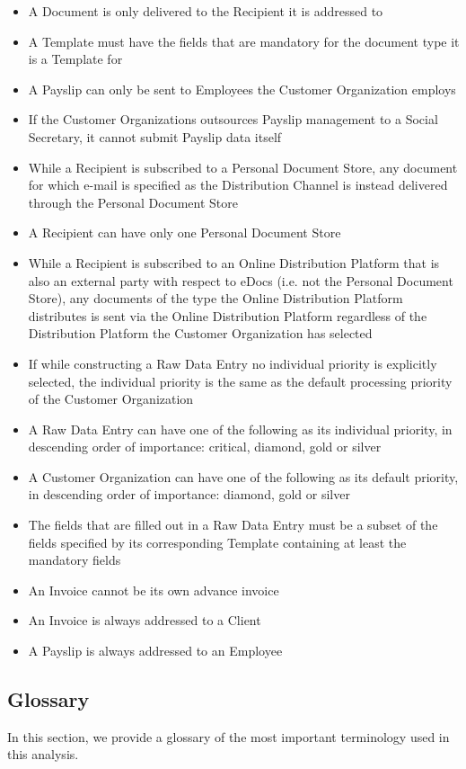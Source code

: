 \documentclass[a4paper,10pt]{article}
\begin{document}
\begin{itemize}
    \item A Document is only delivered to the Recipient it is addressed to
    \item A Template must have the fields that are mandatory for the document type it is a Template for
    \item A Payslip can only be sent to Employees the Customer Organization employs
    \item If the Customer Organizations outsources Payslip management to a Social Secretary, it cannot submit Payslip data itself
    \item While a Recipient is subscribed to a Personal Document Store, any document for which e-mail is specified as the Distribution Channel is instead delivered through the Personal Document Store
    \item A Recipient can have only one Personal Document Store
    \item While a Recipient is subscribed to an Online Distribution Platform that is also an external party with respect to eDocs (i.e. not the Personal Document Store), any documents of the type the Online Distribution Platform distributes is sent via the Online Distribution Platform regardless of the Distribution Platform the Customer Organization has selected
    \item If while constructing a Raw Data Entry no individual priority is explicitly selected, the individual priority is the same as the default processing priority of the Customer Organization
    \item A Raw Data Entry can have one of the following as its individual priority, in descending order of importance: critical, diamond, gold or silver
    \item A Customer Organization can have one of the following as its default priority, in descending order of importance: diamond, gold or silver
    \item The fields that are filled out in a Raw Data Entry must be a subset of the fields specified by its corresponding Template containing at least the mandatory fields
    \item An Invoice cannot be its own advance invoice
    \item An Invoice is always addressed to a Client
    \item A Payslip is always addressed to an Employee
\end{itemize}

\subsection{Glossary}
In this section, we provide a glossary of the most important terminology used
in this analysis.
\end{document}
